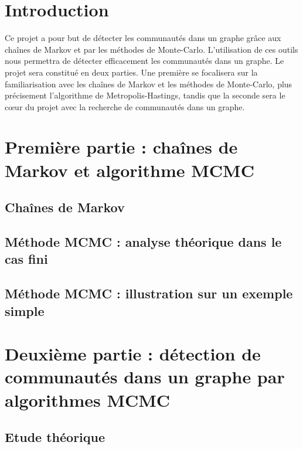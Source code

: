 \documentclass[11pt]{article}
\begin{document}
\thispagestyle{empty}
\tableofcontents
\listoffigures
\listoftables
\pagebreak
\setcounter{page}{1}

\section*{Introduction}
Ce projet a pour but de détecter les communautés dans un graphe grâce aux chaînes de Markov et par les méthodes de Monte-Carlo. L'utilisation de ces outils nous permettra de détecter efficacement les communautés dans un graphe.
Le projet sera constitué en deux parties. Une première se focalisera sur la familiarisation avec les chaînes de Markov et les méthodes de Monte-Carlo, plus précisement l'algorithme de Metropolis-Hastings, tandis que la seconde sera le cœur du projet 
avec la recherche de communautés dans un graphe.

\section{Première partie : chaînes de Markov et algorithme MCMC}

\subsection{Chaînes de Markov}


\subsection{Méthode MCMC : analyse théorique dans le cas fini}


\subsection{Méthode MCMC : illustration sur un exemple simple}


\pagebreak
\section{Deuxième partie : détection de communautés dans un graphe par algorithmes MCMC}

\subsection{Etude théorique}

\end{document}
